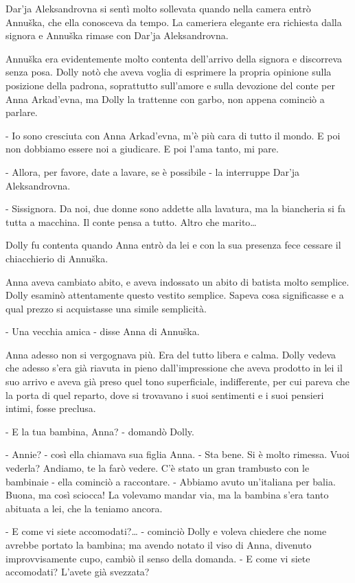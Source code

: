 Dar'ja Aleksandrovna si sentì molto sollevata quando nella camera entrò Annuška, che ella conosceva da tempo. La cameriera elegante era richiesta dalla signora e Annuška rimase con Dar'ja Aleksandrovna. 

Annuška era evidentemente molto contenta dell'arrivo della signora e discorreva senza posa. Dolly notò che aveva voglia di esprimere la propria opinione sulla posizione della padrona, soprattutto sull'amore e sulla devozione del conte per Anna Arkad'evna, ma Dolly la trattenne con garbo, non appena cominciò a parlare. 

- Io sono cresciuta con Anna Arkad'evna, m'è più cara di tutto il mondo. E poi non dobbiamo essere noi a giudicare. E poi l'ama tanto, mi pare. 

- Allora, per favore, date a lavare, se è possibile - la interruppe Dar'ja Aleksandrovna. 

- Sissignora. Da noi, due donne sono addette alla lavatura, ma la biancheria si fa tutta a macchina. Il conte pensa a tutto. Altro che marito\ldots{} 

Dolly fu contenta quando Anna entrò da lei e con la sua presenza fece cessare il chiacchierio di Annuška. 

Anna aveva cambiato abito, e aveva indossato un abito di batista molto semplice. Dolly esaminò attentamente questo vestito semplice. Sapeva cosa significasse e a qual prezzo si acquistasse una simile semplicità. 

- Una vecchia amica - disse Anna di Annuška. 

Anna adesso non si vergognava più. Era del tutto libera e calma. Dolly vedeva che adesso s'era già riavuta in pieno dall'impressione che aveva prodotto in lei il suo arrivo e aveva già preso quel tono superficiale, indifferente, per cui pareva che la porta di quel reparto, dove si trovavano i suoi sentimenti e i suoi pensieri intimi, fosse preclusa. 

- E la tua bambina, Anna? - domandò Dolly. 

- Annie? - così ella chiamava sua figlia Anna. - Sta bene. Si è molto rimessa. Vuoi vederla? Andiamo, te la farò vedere. C'è stato un gran trambusto con le bambinaie - ella cominciò a raccontare. - Abbiamo avuto un'italiana per balia. Buona, ma così sciocca! La volevamo mandar via, ma la bambina s'era tanto abituata a lei, che la teniamo ancora. 

- E come vi siete accomodati?\ldots{} - cominciò Dolly e voleva chiedere che nome avrebbe portato la bambina; ma avendo notato il viso di Anna, divenuto improvvisamente cupo, cambiò il senso della domanda. - E come vi siete accomodati? L'avete già svezzata? 

